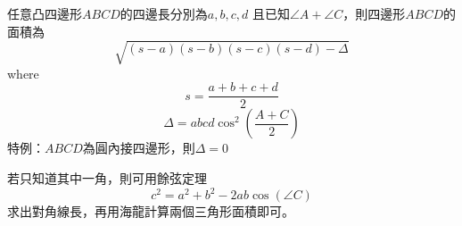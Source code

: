 任意凸四邊形$ABCD$的四邊長分別為$a,b,c,d$
且已知$\angle A+\angle C$，則四邊形$ABCD$的面積為
\[
    \sqrt{(s-a)(s-b)(s-c)(s-d)-\Delta}
\]
where
\[
    s=\frac{a+b+c+d}{2}
\]
\[
    \Delta=abcd\cos^2\left(\frac{A+C}{2}\right)
\]
特例：$ABCD$為圓內接四邊形，則$\Delta=0$ \par
若只知道其中一角，則可用餘弦定理
\[
    c^2 = a^2+b^2-2ab\cos(\angle C)
\]
求出對角線長，再用海龍計算兩個三角形面積即可。